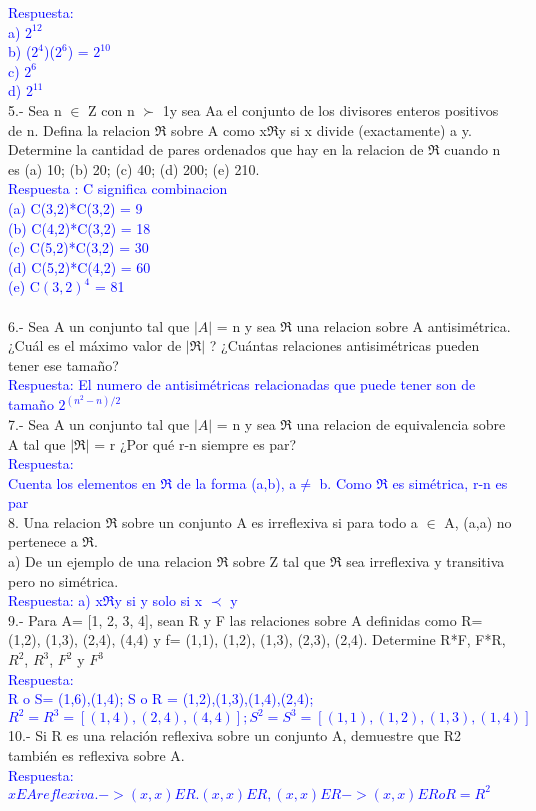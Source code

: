 \documentclass{article}
\begin{document}
\textcolor{blue}{Respuesta:\\ a) $2^12$ \\ b) ($2^4$)($2^6$) = $2^10$ \\ c) $2^6$ \\ d) $2^11$ }
\\
5.- Sea n $\in$ Z con n $\succ$ 1y sea Aa el conjunto de los divisores enteros positivos de n. Defina la relacion $\Re$ sobre A como x$\Re$y si x divide (exactamente) a y. Determine la cantidad de pares ordenados que hay en la relacion de $\Re$ cuando n es (a) 10; (b) 20; (c) 40; (d) 200; (e) 210.\\
\textcolor{blue}{Respuesta : C significa combinacion\\ 
(a) C(3,2)*C(3,2) = 9\\ 
(b) C(4,2)*C(3,2) = 18\\
(c) C(5,2)*C(3,2) = 30\\
(d) C(5,2)*C(4,2) = 60\\ 
(e) C$(3,2)^4$ = 81\\
}
\\
6.- Sea  A un conjunto tal que $|A|$ = n y sea $\Re$ una relacion sobre A antisimétrica. ¿Cuál es el máximo valor de $|\Re|$ ? ¿Cuántas relaciones antisimétricas pueden tener ese tamaño?\\
\textcolor{blue}{Respuesta: El numero de antisimétricas relacionadas que puede tener son de tamaño $2^{(n^2-n)/2}$ }
\\
7.- Sea A un conjunto tal que $|A|$ = n y sea $\Re$ una relacion de equivalencia sobre A tal que $|\Re|$ = r ¿Por qué r-n siempre es par?
\\
\textcolor{blue}{Respuesta: \\
Cuenta los elementos en $\Re$ de la forma (a,b), a$\neq$ b. Como $\Re$ es simétrica, r-n es par
}\\
8. Una relacion $\Re$ sobre un conjunto A es irreflexiva si para todo a $\in$ A, (a,a) no pertenece a $\Re$.\\
a) De un ejemplo de una relacion $\Re$ sobre Z tal que $\Re$ sea irreflexiva y transitiva pero no simétrica.\\
\textcolor{blue}{Respuesta:
a)  x$\Re$y si y solo si x $\prec$ y
}\\
9.- Para A= [1, 2, 3, 4], sean R y F las relaciones sobre A definidas como R= {(1,2), (1,3), (2,4), (4,4)} y f= {(1,1), (1,2), (1,3), (2,3), (2,4)}. Determine R*F, F*R, $R^2$, $R^3$, $F^2$ y $F^3$\\
\textcolor{blue}{Respuesta:\\R o S= {(1,6),(1,4)}; S o R = {(1,2),(1,3),(1,4),(2,4)};
$R^2 = R^3 = [(1,4),(2,4),(4,4)];
S^2 = S^3 = [(1,1),(1,2),(1,3),(1,4)]$}\\
10.- Si R es una relación reflexiva sobre un conjunto A, demuestre que R2 también es reflexiva sobre A. \\
\textcolor{blue}{Respuesta: $x E A reflexiva.->(x,x) E R. (x,x) E R,(x,x) E R->(x,x) E R o R=R^2$}\\
\end{document}
